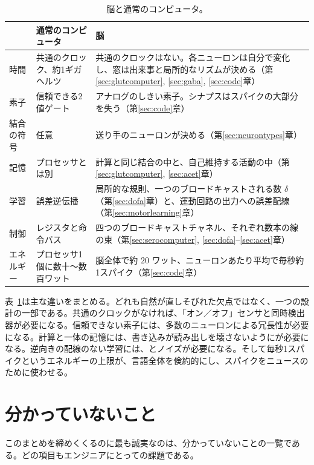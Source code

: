 \begin{table}[t]
\centering
\footnotesize
\setlength{\tabcolsep}{4pt}
\renewcommand{\arraystretch}{1.15}
\begin{tabular}{>{\raggedright}p{2.2cm}>{\raggedright}p{4.2cm}>{\raggedright\arraybackslash}p{6.6cm}}
\toprule
& 通常のコンピュータ & 脳 \\
\midrule
時間 & 共通のクロック、約1ギガヘルツ & 共通のクロックはない。各ニューロンは自分で変化し、窓は出来事と局所的なリズムが決める（第\ref{sec:glutcomputer}, \ref{sec:gaba}, \ref{sec:code}章） \\
素子 & 信頼できる2値ゲート & アナログのしきい素子。シナプスはスパイクの大部分を失う（第\ref{sec:code}章） \\
結合の符号 & 任意 & 送り手のニューロンが決める（第\ref{sec:neurontypes}章） \\
記憶 & プロセッサとは別 & 計算と同じ結合の中と、自己維持する活動の中（第\ref{sec:glutcomputer}, \ref{sec:acet}章） \\
学習 & 誤差逆伝播 & 局所的な規則、一つのブロードキャストされる数 $\delta$（第\ref{sec:dofa}章）と、運動回路の出力への誤差配線（第\ref{sec:motorlearning}章） \\
制御 & レジスタと命令バス & 四つのブロードキャストチャネル、それぞれ数本の線の束（第\ref{sec:serocomputer}, \ref{sec:dofa}--\ref{sec:acet}章） \\
エネルギー & プロセッサ1個に数十〜数百ワット & 脳全体で約 $20$ ワット、ニューロンあたり平均で毎秒約1スパイク（第\ref{sec:code}章） \\
\bottomrule
\end{tabular}
\caption{脳と通常のコンピュータ。}
\label{tab:computer}
\end{table}

表~\ref{tab:computer}は主な違いをまとめる。どれも自然が直しそびれた欠点ではなく、一つの設計の一部である。共通のクロックがなければ、「オン／オフ」センサと同時検出器が必要になる。信頼できない素子には、多数のニューロンによる冗長性が必要になる。計算と一体の記憶には、書き込みが読み出しを壊さないようにが必要になる。逆向きの配線のない学習には、とノイズが必要になる。そして毎秒1スパイクというエネルギーの上限が、言語全体を倹約的にし、スパイクをニュースのために使わせる。

\section{分かっていないこと}

このまとめを締めくくるのに最も誠実なのは、分かっていないことの一覧である。どの項目もエンジニアにとっての課題である。

